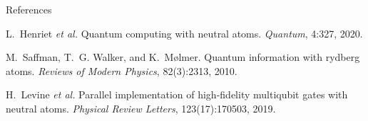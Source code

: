 \documentclass{beamer}
\begin{document}
\begin{frame}{References}
    \begin{thebibliography}{10}
        \beamertemplatetextbibitems
        L.~Henriet \emph{et al.}
        \newblock Quantum computing with neutral atoms.
        \newblock \emph{Quantum}, 4:327, 2020.
        
        \beamertemplatetextbibitems
        M.~Saffman, T.~G. Walker, and K.~Mølmer.
        \newblock Quantum information with rydberg atoms.
        \newblock \emph{Reviews of Modern Physics}, 82(3):2313, 2010.
        
        \beamertemplatetextbibitems
        H.~Levine \emph{et al.}
        \newblock Parallel implementation of high-fidelity multiqubit gates with neutral atoms.
        \newblock \emph{Physical Review Letters}, 123(17):170503, 2019.
    \end{thebibliography}
\end{frame}
\end{document}
